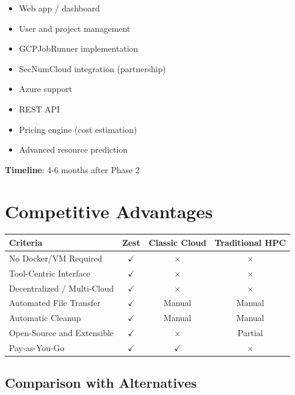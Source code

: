 \documentclass[11pt,a4paper]{article}
\begin{document}
	\begin{itemize}
		\item[\,-] Web app / dashboard
		\item[\,-] User and project management
		\item[\,-] GCPJobRunner implementation
		\item[\,-] SecNumCloud integration (partnership)
		\item[\,-] Azure support
		\item[\,-] REST API
		\item[\,-] Pricing engine (cost estimation)
		\item[\,-] Advanced resource prediction
	\end{itemize}
	
	\textbf{Timeline}: 4-6 months after Phase 2
	
	\newpage
	
	\section{Competitive Advantages}
	
	\begin{table}[H]
		\centering
		\small
		\begin{tabularx}{\linewidth}{l | c | c | c}
			\toprule
			\textbf{Criteria} & \textbf{Zest} & \textbf{Classic Cloud} & \textbf{Traditional HPC} \\
			\midrule
			No Docker/VM Required & $\checkmark$ & $\times$ & $\times$ \\
			Tool-Centric Interface & $\checkmark$ & $\times$ & $\times$ \\
			Decentralized / Multi-Cloud & $\checkmark$ & $\times$ & $\times$ \\
			Automated File Transfer & $\checkmark$ & Manual & Manual \\
			Automatic Cleanup & $\checkmark$ & Manual & Manual \\
			Open-Source and Extensible & $\checkmark$ & $\times$ & Partial \\
			Pay-as-You-Go & $\checkmark$ & $\checkmark$ & $\times$ \\
			\bottomrule
		\end{tabularx}
	\end{table}
	
	\subsection{Comparison with Alternatives}
	
\end{document}
